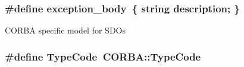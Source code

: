 \subsubsection[{exception\_\-body}]{\setlength{\rightskip}{0pt plus 5cm}\#define exception\_\-body~\{ string description; \}}\label{SDOPackage_8idl_a323e32c35a492d5fd6880568fc2ced8e}
CORBA specific model for SDOs 
\subsubsection[{TypeCode}]{\setlength{\rightskip}{0pt plus 5cm}\#define TypeCode~CORBA::TypeCode}\label{SDOPackage_8idl_a237806f5539769ecfbad2352106cb773}
